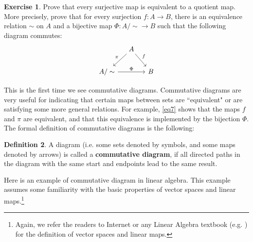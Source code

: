 \documentclass[12pt,b5paper,notitlepage]{article}
\theoremstyle{definition}
\newtheorem{df}{Definition}[section]
\newtheorem{exe}[df]{Exercise}
\theoremstyle{plain}
\numberwithin{equation}{section}
\begin{document}
\begin{exe}
Prove that every surjective map  is equivalent to a quotient map. More precisely, prove that for every surjection $f:A\rightarrow B$, there is an equivalence relation $\sim$ on $A$ and a bijective map $\Phi:{A/\sim}\rightarrow B$ such that the following diagram commutes:
\begin{equation}\label{eq7}
\begin{tikzcd}[column sep=small]
                          & A \arrow[rd, "f"] \arrow[ld, "\pi"'] &   \\
{A/\sim} \arrow[rr, "\Phi"] &                                      & B
\end{tikzcd}
\end{equation}
\end{exe}


This is the first time we see commutative diagrams. Commutative diagrams are very useful for indicating that certain maps between sets are ``equivalent" or are satisfying some more general relations. For example, \eqref{eq7} shows that the maps $f$ and $\pi$ are equivalent, and that this equivalence is implemented by the bijection $\Phi$. The formal definition of commutative diagrams is the following:


\begin{df}
A diagram (i.e. some sets denoted by symbols, and some maps denoted by arrows) is called a \textbf{commutative diagram},  if all directed paths in the diagram with the same start and endpoints lead to the same result.
\end{df}


Here is an example of commutative diagram in linear algebra. This example assumes some familiarity with the basic properties of vector spaces  and linear maps.\footnote{Again, we refer the readers to Internet or any Linear Algebra textbook (e.g. \cite{Axl}) for the definition of vector spaces and linear maps.}
\end{document}
